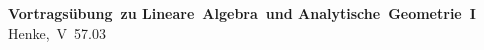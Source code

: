 \small\textbf{\nohyphens{Vortragsübung~zu Lineare~Algebra~und Analytische~Geometrie~I}}
\footnotesize\nohyphens{Henke,~V~57.03}
